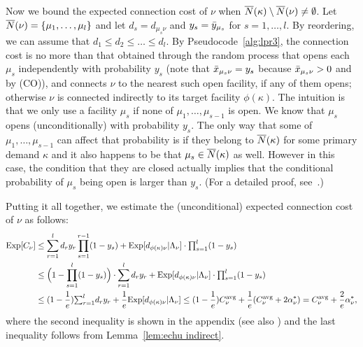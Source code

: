 \documentclass{llncs}
\begin{document}
Now we bound the expected connection cost of $\nu$ when
${\overline{N}}(\kappa)\setminus {\overline{N}}(\nu)\neq\emptyset$.  Let ${\overline{N}}(\nu)
= { \left\{ \mu_1,\ldots,\mu_l \right\} }$ and let $d_s = d_{\mu_s\nu}$ and $y_s =
{\bar y}_{\mu_s}$ for $s = 1,\ldots,l$. By reordering, we can assume that
$d_1 \le d_2 \le \ldots \le d_l$.  By Pseudocode~\ref{alg:lpr3}, the
connection cost is no more than that obtained through the random
process that opens each $\mu_s$ independently with probability $y_{s}$
(note that ${\bar x}_{\mu_s \nu} = y_{s}$ because ${\bar x}_{\mu_s \nu} > 0$
and by (CO)), and connects $\nu$ to the nearest such open facility, if
any of them opens; otherwise $\nu$ is connected indirectly to its
target facility $\phi(\kappa)$. The intuition is that we only use a
facility $\mu_s$ if none of $\mu_1,\ldots,\mu_{s-1}$ is open. We know
that $\mu_s$ opens (unconditionally) with probability $y_{s}$. The
only way that some of $\mu_1,\ldots,\mu_{s-1}$ can affect that
probability is if they belong to ${\overline{N}}(\kappa)$ for some primary
demand $\kappa$ and it also happens to be that $\mu_s \in
{\overline{N}}(\kappa)$ as well. However in this case, the condition that they
are closed actually implies that the conditional probability of
$\mu_s$ being open is larger than $y_{s}$. (For a detailed proof,
see~\cite{ChudakS04}.)

Putting it all together, we estimate the (unconditional) expected 
connection cost of $\nu$ as follows:
%
\begin{align*}
  \mbox{\rm Exp}[C_\nu] &\leq 
	\sum_{r=1}^l d_ry_r\prod_{s=1}^{r-1}(1-y_s)
		+  \mbox{\rm Exp}[ d_{\phi(\kappa)\nu} |\Lambda_\nu]\cdot \textstyle{\prod_{s=1}^{l}} (1-y_{s})
		\\
  &\leq \Big(1 - \prod_{s=1}^l (1-y_s)\Big) \cdot \sum_{r=1}^l d_r y_r
	+  \mbox{\rm Exp}[ d_{\phi(\kappa)\nu} |\Lambda_\nu ]\cdot \textstyle{\prod_{s=1}^{l}} (1-y_{s})
	\\
  &\leq (1-\frac{1}{e}) {\textstyle\sum_{r=1}^l} d_ry_r 
	+ \frac{1}{e} \mbox{\rm Exp}[ d_{\phi(\kappa)\nu} |\Lambda_\nu ]
   \leq (1-\frac{1}{e}) C^{{\mbox{\scriptsize\rm avg}}}_{\nu} 
	+	\frac{1}{e}	(C^{{\mbox{\scriptsize\rm avg}}}_{\nu} + 2\alpha_{\nu}^\ast) = C^{{\mbox{\scriptsize\rm avg}}}_{\nu} + \frac{2}{e}\alpha_{\nu}^\ast,
\end{align*}
%
where the second inequality is shown in the appendix
(see also \cite{ChudakS04}) and the last inequality follows from
Lemma~\ref{lem:echu indirect}. 
\end{document}

